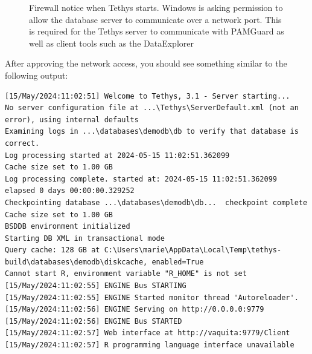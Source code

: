 \documentclass[
]{article}
\begin{document}
\begin{figure}


\caption{\label{fig-tethyswarning}Firewall notice when Tethys starts.
Windows is asking permission to allow the database server to communicate
over a network port. This is required for the Tethys server to
communicate with PAMGuard as well as client tools such as the
DataExplorer}

\end{figure}%

After approving the network access, you should see something similar to
the following output:

\begin{verbatim}
[15/May/2024:11:02:51] Welcome to Tethys, 3.1 - Server starting...
No server configuration file at ...\Tethys\ServerDefault.xml (not an error), using internal defaults
Examining logs in ...\databases\demodb\db to verify that database is correct.
Log processing started at 2024-05-15 11:02:51.362099
Cache size set to 1.00 GB
Log processing complete. started at: 2024-05-15 11:02:51.362099 elapsed 0 days 00:00:00.329252
Checkpointing database ...\databases\demodb\db...  checkpoint complete
Cache size set to 1.00 GB
BSDDB environment initialized
Starting DB XML in transactional mode
Query cache: 128 GB at C:\Users\marie\AppData\Local\Temp\tethys-build\databases\demodb\diskcache, enabled=True
Cannot start R, environment variable "R_HOME" is not set
[15/May/2024:11:02:55] ENGINE Bus STARTING
[15/May/2024:11:02:55] ENGINE Started monitor thread 'Autoreloader'.
[15/May/2024:11:02:56] ENGINE Serving on http://0.0.0.0:9779
[15/May/2024:11:02:56] ENGINE Bus STARTED
[15/May/2024:11:02:57] Web interface at http://vaquita:9779/Client 
[15/May/2024:11:02:57] R programming language interface unavailable
\end{verbatim}
\end{document}
